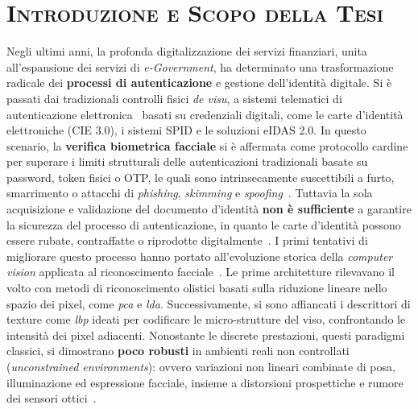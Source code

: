 \chapter{\scshape Introduzione e Scopo della Tesi}

Negli ultimi anni, la profonda digitalizzazione dei servizi finanziari, unita all'espansione dei servizi di \textit{e-Government}, ha determinato una trasformazione radicale dei \textbf{processi di autenticazione} e gestione dell'identità digitale.
Si è passati dai tradizionali controlli fisici \textit{de visu}, a sistemi telematici di autenticazione elettronica~\cite{benalcazarSyntheticIDCard2023}  basati su credenziali digitali, come le carte d'identità elettroniche (CIE 3.0), i sistemi SPID e le soluzioni eIDAS 2.0.
In questo scenario, la \textbf{verifica biometrica facciale} si è affermata come protocollo cardine per superare i limiti strutturali delle autenticazioni tradizionali basate su password, token fisici o OTP, le quali sono intrinsecamente suscettibili a furto, smarrimento o attacchi di \textit{phishing}, \textit{skimming} e \textit{spoofing}~\cite{azizFaceRecognitionBase2024}.
Tuttavia la sola acquisizione e validazione del documento d'identità \textbf{non è sufficiente} a garantire la sicurezza del processo di autenticazione, in quanto le carte d'identità possono essere rubate, contraffatte o riprodotte digitalmente~\cite{kelesRepublicTurkeyIdentity2020}.
I primi tentativi di migliorare questo processo hanno portato all'evoluzione storica della \textit{computer vision} applicata al riconoscimento facciale~\cite{azizFaceRecognitionBase2024}.
Le prime architetture rilevavano il volto con metodi di riconoscimento olistici basati sulla riduzione lineare nello spazio dei pixel, come \textit{\gls{pca}} e \textit{\gls{lda}}. Successivamente, si sono affiancati i descrittori di texture come \textit{\gls{lbp}} ideati per codificare le micro-strutture del viso, confrontando le intensità dei pixel adiacenti.
Nonostante le discrete prestazioni, questi paradigmi classici, si dimostrano \textbf{poco robusti} in ambienti reali non controllati (\textit{unconstrained environments}): ovvero variazioni non lineari combinate di posa, illuminazione ed espressione facciale, insieme a distorsioni prospettiche e rumore dei sensori ottici~\cite{azizFaceRecognitionBase2024,shiDocFaceMatchingID2018}.

